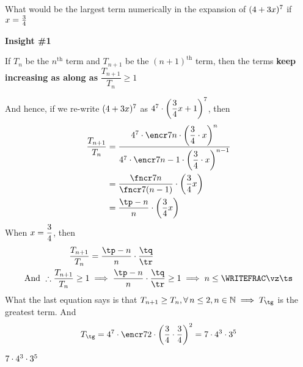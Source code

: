 



\renewcommand{\vd}{\dfrac{\vb}{\va}}

\ADD{}\tp
\SQUARE\vb\tq
\SQUARE\va\tr
\ADD\tq\tr\ts
\MULTIPLY\tp\tq\vz
\ADD{}\tg

\question[5] What would be the largest term numerically in the expansion of $(4 + 3 x)^{7}$ if 
$x = \frac{3}{4}$

\watchout

\begin{solution}[\fullpage]
  \textbf{Insight \#1}

	If $T_n$ be the $n^{\text{th}}$ term and $T_{n+1}$ be the $(n+1)^{\text{th}}$ term, then
	the terms \textbf{keep increasing as along as} $\dfrac{T_{n+1}}{T_n} \geq 1$
	
	And hence, if we re-write $(4 + 3 x)^7$ as $\va^\vc\cdot\left(\vd x + 1\right)^\vc$, then
	\begin{align}
		\dfrac{T_{n+1}}{T_n} &= \dfrac
		{\va^\vc\cdot\encr\vc{n}\cdot\left( \vd\cdot x\right)^{n}}
		{\va^\vc\cdot\encr\vc{n-1}\cdot\left( \vd\cdot x\right)^{n-1}} \\
		&= \dfrac{\fncr\vc{n}}{\fncr\vc{(n-1)}}\cdot\left( \vd x \right) \\
		&= \dfrac{\tp - n}{n}\cdot\left( \vd x \right)
	\end{align}	 
	When $x = \vd$, then 
	\begin{align}
		\dfrac{T_{n+1}}{T_n} &= \dfrac{\tp -n}{n}\cdot\dfrac{\tq}{\tr} \\
		\text{And }\therefore \dfrac{T_{n+1}}{T_n} \geq 1 &\implies
		\dfrac{\tp -n}{n}\cdot\dfrac{\tq}{\tr} \geq 1 \implies
    n \leq \WRITEFRAC\vz\ts 
	\end{align}
  What the last equation says is that $T_{n+1}\geq T_n,\forall\, n\leq\ve, n\in\mathbb{N}\implies T_{\tg}$ 
  is the greatest term. And 
	\[ T_{\tg} = \va^{\vc}\cdot\encr\vc\ve\cdot\left( \vd\cdot\dfrac{\vb}{\va} \right)^{\ve}
  = \vf \]
\end{solution}

\ifprintanswers\begin{codex}$7\cdot 4^3 \cdot 3^5$\end{codex}\fi
